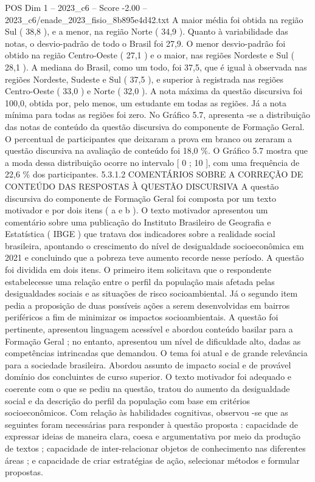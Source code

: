 \begin{textsample}{POS Dim 1 – 2023\_c6 – Score -2.00 – 2023\_c6/enade\_2023\_fisio\_8b895e4d42.txt}
A maior média foi obtida na região Sul ( 38,8 ), e a menor, na região Norte ( 34,9 ).
Quanto à variabilidade das notas, o desvio-padrão de todo o Brasil foi 27,9.
O menor desvio-padrão foi obtido na região Centro-Oeste ( 27,1 ) e o maior, nas regiões Nordeste e Sul ( 28,1 ).
A mediana do Brasil, como um todo, foi 37,5, que é igual à observada nas regiões Nordeste, Sudeste e Sul ( 37,5 ), e superior à registrada nas regiões Centro-Oeste ( 33,0 ) e Norte ( 32,0 ).
A nota máxima da questão discursiva foi 100,0, obtida por, pelo menos, um estudante em todas as regiões.
Já a nota mínima para todas as regiões foi zero.
No Gráfico 5.7, apresenta -se a distribuição das notas de conteúdo da questão discursiva do componente de Formação Geral.
O percentual de participantes que deixaram a prova em branco ou zeraram a questão discursiva na avaliação de conteúdo foi 18,0 \%.
O Gráfico 5.7 mostra que a moda dessa distribuição ocorre no intervalo [ 0 ; 10 ], com uma frequência de 22,6 \% dos participantes. 5.3.1.2 COMENTÁRIOS SOBRE A CORREÇÃO DE CONTEÚDO DAS RESPOSTAS À QUESTÃO DISCURSIVA A questão discursiva do componente de Formação Geral foi composta por um texto motivador e por dois itens ( a e b ).
O texto motivador apresentou um comentário sobre uma publicação do Instituto Brasileiro de Geografia e Estatística ( IBGE ) que tratava dos indicadores sobre a realidade social brasileira, apontando o crescimento do nível de desigualdade socioeconômica em 2021 e concluindo que a pobreza teve aumento recorde nesse período.
A questão foi dividida em dois itens.
O primeiro item solicitava que o respondente estabelecesse uma relação entre o perfil da população mais afetada pelas desigualdades sociais e as situações de risco socioambiental.
Já o segundo item pedia a proposição de duas possíveis ações a serem desenvolvidas em bairros periféricos a fim de minimizar os impactos socioambientais.
A questão foi pertinente, apresentou linguagem acessível e abordou conteúdo basilar para a Formação Geral ; no entanto, apresentou um nível de dificuldade alto, dadas as competências intrincadas que demandou.
O tema foi atual e de grande relevância para a sociedade brasileira.
Abordou assunto de impacto social e de provável domínio dos concluintes de curso superior.
O texto motivador foi adequado e coerente com o que se pediu na questão, tratou do aumento da desigualdade social e da descrição do perfil da população com base em critérios socioeconômicos.
Com relação às habilidades cognitivas, observou -se que as seguintes foram necessárias para responder à questão proposta : capacidade de expressar ideias de maneira clara, coesa e argumentativa por meio da produção de textos ; capacidade de inter-relacionar objetos de conhecimento nas diferentes áreas ; e capacidade de criar estratégias de ação, selecionar métodos e formular propostas.

\end{textsample}
